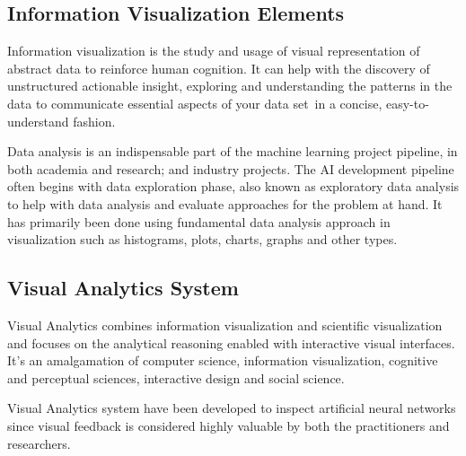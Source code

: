 \subsection{Information Visualization Elements}

Information visualization is the study and usage of visual representation of abstract data to reinforce human cognition. It can help with the discovery of unstructured actionable insight, exploring and understanding the patterns in the data to communicate essential aspects of your data set in a concise, easy-to-understand fashion.

Data analysis is an indispensable part of the machine learning project pipeline, in both academia and research; and industry projects. The AI development pipeline often begins with data exploration phase, also known as exploratory data analysis to help with data analysis and evaluate approaches for the problem at hand. It has primarily been done using fundamental data analysis approach in visualization such as histograms, plots, charts, graphs and other types.

\subsection{Visual Analytics System}
    
Visual Analytics combines information visualization and scientific visualization and focuses on the analytical reasoning enabled with interactive visual interfaces. It’s an amalgamation of computer science, information visualization, cognitive and perceptual sciences, interactive design and social science.

Visual Analytics system have been developed to inspect artificial neural networks since visual feedback is considered highly valuable by both the practitioners and researchers.


